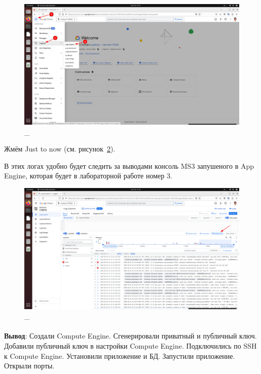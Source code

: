 \documentclass[12pt, a4paper, simple]{eskdtext}
\begin{document}
  \begin{figure}[!h]
    \centering
    \includegraphics[width=14cm]
    {images/2023-02-26_01-32-00.png}
    \caption{\_}
    \label{fig:32}
  \end{figure}

  Жмём Just to now (см. рисунок~\ref{fig:33}).

  В этих логах удобно будет следить за выводами консоль MS3 запушеного в App Engine, которая будет в лабораторной работе номер 3.

  \begin{figure}[!h]
    \centering
    \includegraphics[width=16cm]
    {images/2023-02-26_01-32-59.png}
    \caption{\_}
    \label{fig:33}
  \end{figure}
  
  \paragraph{} \textbf{Вывод}:
  Создали Compute Engine. Сгенерировали приватный и публичный ключ. Добавили публичный ключ в настройки Compute Engine.
  Подключились по SSH к Compute Engine. Установили приложение и БД. Запустили приложение. Открыли порты.
\end{document}
